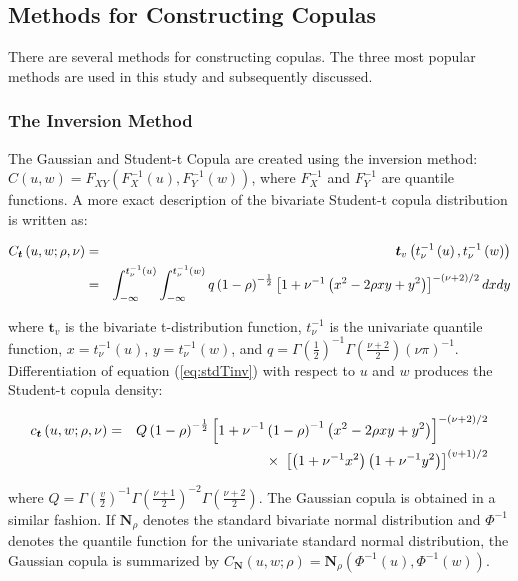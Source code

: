 \subsection{Methods for Constructing Copulas}

There are several methods for constructing copulas. The three most popular methods are used in this study and subsequently discussed.

\subsubsection{The Inversion Method}

The Gaussian and Student-t Copula are created using the inversion method: $C\left(u,w\right) = F_{XY}\left(F_{X}^{-1}\left(u\right),F_{Y}^{-1}\left(w\right)\right)$, where $F_{X}^{-1}$ and $F_{Y}^{-1}$ are quantile functions. A more exact description of the bivariate Student-t copula distribution is written as:

\begin{eqnarray} \label{eq:stdTinv}
	C_{\boldsymbol{t}}\left(u,w;\rho,\nu\right) &=& \boldsymbol{t}_{v}\left(t_{\nu}^{-1}\left(u\right), t_{\nu}^{-1}\left(w\right)\right) \\
	&=& \int_{-\infty}^{t_{\nu}^{-1}\left(u\right)}\int_{-\infty}^{t_{\nu}^{-1}\left(w\right)}q\left(1-\rho\right)^{-\frac{1}{2}}\left[1+\nu^{-1}\left(x^{2}-2\rho xy + y^{2}\right)\right]^{-\left(\nu + 2\right)
	/2}dxdy \notag
\end{eqnarray}

where $\boldsymbol{t}_{v}$ is the bivariate t-distribution function, $t_{\nu}^{-1}$ is the univariate quantile function, $x = t_{\nu}^{-1}\left(u\right)$, $y = t_{\nu }^{-1}\left(w\right)$, and $q = \Gamma\left(\frac{1}{2}\right)^{-1}\Gamma\left(\frac{\nu +2}{2}\right)\left(\nu\pi\right)^{-1}$. Differentiation of equation (\ref{eq:stdTinv}) with respect to $u$ and $w$ produces the Student-t copula density:

\begin{eqnarray}
	c_{\boldsymbol{t}}\left(u,w;\rho,\nu\right) &=& Q\left(1-\rho\right)^{-\frac{1}{2}}\left[1+\nu^{-1}\left(1-\rho\right)^{-1}\left(x^{2}-2\rho xy+y^{2}\right)\right]^{-\left(\nu +2\right)/2} \notag \\
	&& \times~\left[\left(1+\nu^{-1}x^{2}\right)\left(1+\nu^{-1}y^{2}\right)\right]^{\left(v+1\right)/2}
\end{eqnarray}

where $Q=\Gamma\left(\frac{v}{2}\right)^{-1}\Gamma\left(\frac{\nu +1}{2}\right)^{-2}\Gamma\left(\frac{\nu +2}{2}\right)$. The Gaussian copula is obtained in a similar fashion. If $\boldsymbol{N}_{\rho}$ denotes the standard bivariate normal distribution and $\Phi^{-1}$ denotes the quantile function for the univariate standard normal distribution, the Gaussian copula is summarized by $C_{\boldsymbol{N}}\left(u,w;\rho\right) = \boldsymbol{N}_{\rho}\left(\Phi^{-1}\left(u\right),\Phi^{-1}\left(w\right)\right)$.

